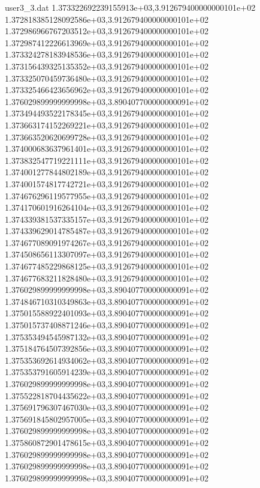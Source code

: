 \begin{filecontents}{user3_3.dat}
1.373322692239155913e+03,3.912679400000000101e+02
1.372818385128092586e+03,3.912679400000000101e+02
1.372986966767203512e+03,3.912679400000000101e+02
1.372987412226613969e+03,3.912679400000000101e+02
1.373324278183948536e+03,3.912679400000000101e+02
1.373156439325135352e+03,3.912679400000000101e+02
1.373325070459736480e+03,3.912679400000000101e+02
1.373325466423656962e+03,3.912679400000000101e+02
1.376029899999999998e+03,3.890407700000000091e+02
1.373494493522178345e+03,3.912679400000000101e+02
1.373663174152269221e+03,3.912679400000000101e+02
1.373663520620699728e+03,3.912679400000000101e+02
1.374000683637961401e+03,3.912679400000000101e+02
1.373832547719221111e+03,3.912679400000000101e+02
1.374001277844802189e+03,3.912679400000000101e+02
1.374001574817742721e+03,3.912679400000000101e+02
1.374676296119577955e+03,3.912679400000000101e+02
1.374170601916264104e+03,3.912679400000000101e+02
1.374339381537335157e+03,3.912679400000000101e+02
1.374339629014785487e+03,3.912679400000000101e+02
1.374677089091974267e+03,3.912679400000000101e+02
1.374508656113307097e+03,3.912679400000000101e+02
1.374677485229868125e+03,3.912679400000000101e+02
1.374677683211828480e+03,3.912679400000000101e+02
1.376029899999999998e+03,3.890407700000000091e+02
1.374846710310349863e+03,3.890407700000000091e+02
1.375015588922401093e+03,3.890407700000000091e+02
1.375015737408871246e+03,3.890407700000000091e+02
1.375353494545987132e+03,3.890407700000000091e+02
1.375184764507392856e+03,3.890407700000000091e+02
1.375353692614934062e+03,3.890407700000000091e+02
1.375353791605914239e+03,3.890407700000000091e+02
1.376029899999999998e+03,3.890407700000000091e+02
1.375522818704435622e+03,3.890407700000000091e+02
1.375691796307467030e+03,3.890407700000000091e+02
1.375691845802957005e+03,3.890407700000000091e+02
1.376029899999999998e+03,3.890407700000000091e+02
1.375860872901478615e+03,3.890407700000000091e+02
1.376029899999999998e+03,3.890407700000000091e+02
1.376029899999999998e+03,3.890407700000000091e+02
1.376029899999999998e+03,3.890407700000000091e+02
\end{filecontents}